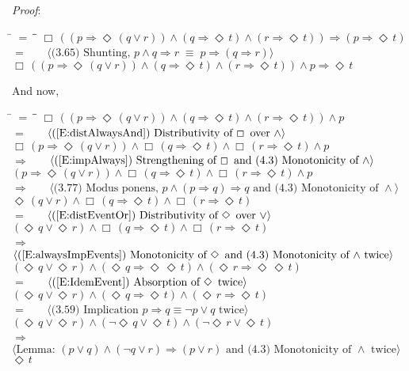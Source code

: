 \documentclass[12pt, fleqn, leqno]{article}
\newcommand{\lgap}{2pt}                             %
\newcommand{\mymathindent}{24pt}                    %
\newcommand{\equivs}{\ensuremath{\;\equiv\;}}       %
\newcommand{\impl}{\ensuremath{\Rightarrow}}        %
\newcommand{\Event}{\Diamond\,}
\newcommand{\Always}{\Box\,}
\newcommand{\myqedtab}{\hspace{384pt}}              %
\newcommand{\Gll} {\langle}                         %
\newcommand{\Ggg} {\rangle}                         %
\newcommand{\Hint}[1]     {\ \ \ $\Gll              \mbox{#1} \Ggg$ }   %
\begin{document}
\emph{Proof}:
\begin{tabbing}
\hspace{\mymathindent} \= $= \;$ \= \myqedtab \= \kill
  \> \>   $\Always ((p \impl \Event (q \lor r)) \land (q \impl \Event t) \land (r \impl \Event t)) \impl (p \impl \Event t)$\\[\lgap]
  \> $=$  \>  \Hint{(3.65) Shunting, $p\land q\impl r\equivs p\impl (q\impl r)$}\\[\lgap]
  \> \>   $\Always ((p \impl \Event (q \lor r)) \land (q \impl \Event t) \land (r \impl \Event t)) \land p \impl \Event t$
\end{tabbing}
And now,
\begin{tabbing}
\hspace{\mymathindent} \= $= \;$ \= \myqedtab \= \kill
  \> \>   $\Always ((p \impl \Event (q \lor r)) \land (q \impl \Event t) \land (r \impl \Event t)) \land p $\\[\lgap]
  \> $=$  \>  \Hint{(\ref{E:distAlwaysAnd}) Distributivity of $\Always$ over $\land$}\\[\lgap]
   \> \>   $\Always (p \impl \Event (q \lor r)) \land \Always (q \impl \Event t) \land \Always (r \impl \Event t) \land p $\\[\lgap]
    \> $\impl$  \>  \Hint{(\ref{E:impAlways}) Strengthening of $\Always$ and (4.3) Monotonicity of $\land$}\\[\lgap]
     \> \>   $(p \impl \Event (q \lor r)) \land \Always (q \impl \Event t) \land \Always (r \impl \Event t) \land p $\\[\lgap]
     \> $\impl$  \>  \Hint{(3.77) Modus ponens, $p\land (p\impl q)\impl q$ and (4.3) Monotonicity of $\land$}\\[\lgap]
 \> \>   $\Event (q \lor r) \land \Always (q \impl \Event t) \land \Always (r \impl \Event t)$\\[\lgap]
 \> $=$  \>  \Hint{(\ref{E:distEventOr}) Distributivity of $\Event$ over $\lor$}\\[\lgap]
 \> \>   $(\Event q \lor \Event r) \land \Always (q \impl \Event t) \land \Always (r \impl \Event t)$\\[\lgap]
 \> $\impl$  \>  \Hint{(\ref{E:alwaysImpEvents}) Monotonicity of $\Event$ and (4.3) Monotonicity of $\land$ twice}\\[\lgap]
 \> \>   $(\Event q \lor \Event r) \land (\Event q \impl \Event\Event t) \land (\Event r \impl \Event\Event t)$\\[\lgap]
 \> $=$  \>  \Hint{(\ref{E:IdemEvent}) Absorption of $\Event$ twice}\\[\lgap]
 \> \>   $(\Event q \lor \Event r) \land (\Event q \impl \Event t) \land (\Event r \impl \Event t)$\\[\lgap]
 \> $=$ \> \Hint{(3.59) Implication $p\impl q\equiv \neg p\lor q$ twice} \\[\lgap]
 \> \>   $(\Event q \lor \Event r) \land (\neg\Event q \lor \Event t) \land (\neg\Event r \lor \Event t)$\\[\lgap]
 \> $\impl$  \>  \Hint{Lemma: $(p \lor q) \land (\neg q \lor r)\impl (p\lor r)$ and (4.3) Monotonicity of $\land$ twice}\\[\lgap]
 \> \>   $\Event t$ \\[\lgap]
\end{tabbing}
\end{document}
